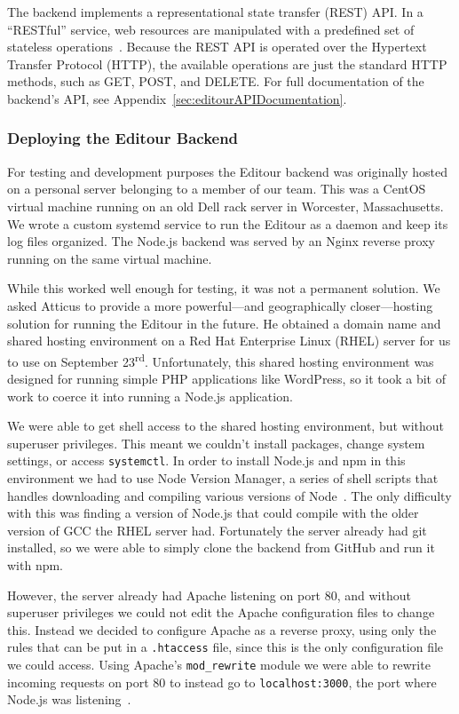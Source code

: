 \documentclass[a4paper, 10pt, american, titlepage]{article}
\begin{document}
The backend implements a representational state transfer (REST) API.
In a ``RESTful'' service, web resources are manipulated with a predefined set of
stateless operations~\autocite{rfc7231}. Because the REST API is operated over
the Hypertext Transfer Protocol (HTTP), the available operations are just the
standard HTTP methods, such as GET, POST, and DELETE. For full documentation of
the backend's API, see Appendix~\ref{sec:editourAPIDocumentation}.

\subsubsection{Deploying the Editour Backend}
\label{sec:deployingTheEditourBackend}

For testing and development purposes the Editour backend was originally hosted
on a personal server belonging to a member of our team. This was a CentOS
virtual machine running on an old Dell rack server in Worcester, Massachusetts.
We wrote a custom systemd service to run the Editour as a daemon and keep its
log files organized. The Node.js backend was served by an Nginx reverse proxy
running on the same virtual machine.

While this worked well enough for testing, it was not a permanent solution. We
asked Atticus to provide a more powerful---and geographically closer---hosting
solution for running the Editour in the future. He obtained a domain name and
shared hosting environment on a Red Hat Enterprise Linux (RHEL) server for us to
use on September 23\textsuperscript{rd}. Unfortunately, this shared hosting
environment was designed for running simple PHP applications like WordPress, so
it took a bit of work to coerce it into running a Node.js application.

We were able to get shell access to the shared hosting environment, but without
superuser privileges. This meant we couldn't install packages, change system
settings, or access \texttt{systemctl}. In order to install Node.js and npm in
this environment we had to use Node Version Manager, a series of shell scripts
that handles downloading and compiling various versions of
Node~\autocite{nvmsh2019}.  The only difficulty with this was finding a version
of Node.js that could compile with the older version of GCC the RHEL server had.
Fortunately the server already had git installed, so we were able to simply
clone the backend from GitHub and run it with npm.

However, the server already had Apache listening on port 80, and without
superuser privileges we could not edit the Apache configuration files to change
this. Instead we decided to configure Apache as a reverse proxy, using only the
rules that can be put in a \texttt{.htaccess} file, since this is the only
configuration file we could access. Using Apache's \texttt{mod\_rewrite} module
we were able to rewrite incoming requests on port 80 to instead go to
\texttt{localhost:3000}, the port where Node.js was
listening~\autocite{apache2019}.
\end{document}
